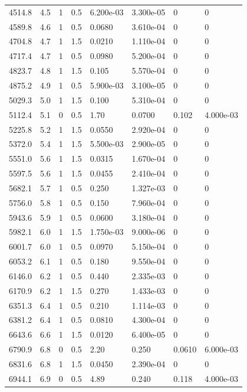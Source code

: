 \documentclass[preview]{standalone}
\begin{document}
{{\begin{tabular}{L{1.2cm}C{1.2cm} C{0.3cm}C{0.5cm} C{1.4cm}C{1.4cm} C{1.4cm}C{1.4cm}}
  4514.8  &   4.5  & 1     & 0.5 &  6.200e-03  & 3.300e-05  & 0 &  0   \\ 
  4589.8  &   4.6  & 1     & 0.5 &  0.0680  & 3.610e-04  & 0 &  0   \\ 
  4704.8  &   4.7  & 1     & 1.5 &  0.0210  & 1.110e-04  & 0 &  0   \\ 
  4717.4  &   4.7  & 1     & 0.5 &  0.0980  & 5.200e-04  & 0 &  0   \\ 
  4823.7  &   4.8  & 1     & 1.5 &  0.105  & 5.570e-04  & 0 &  0   \\ 
  4875.2  &   4.9  & 1     & 0.5 &  5.900e-03  & 3.100e-05  & 0 &  0   \\ 
  5029.3  &   5.0  & 1     & 1.5 &  0.100  & 5.310e-04  & 0 &  0   \\ 
  5112.4  &   5.1  & 0     & 0.5 &  1.70  & 0.0700  & 0.102 &  4.000e-03   \\ 
  5225.8  &   5.2  & 1     & 1.5 &  0.0550  & 2.920e-04  & 0 &  0   \\ 
  5372.0  &   5.4  & 1     & 1.5 &  5.500e-03  & 2.900e-05  & 0 &  0   \\ 
  5551.0  &   5.6  & 1     & 1.5 &  0.0315  & 1.670e-04  & 0 &  0   \\ 
  5597.5  &   5.6  & 1     & 1.5 &  0.0455  & 2.410e-04  & 0 &  0   \\ 
  5682.1  &   5.7  & 1     & 0.5 &  0.250  & 1.327e-03  & 0 &  0   \\ 
  5756.0  &   5.8  & 1     & 0.5 &  0.150  & 7.960e-04  & 0 &  0   \\ 
  5943.6  &   5.9  & 1     & 0.5 &  0.0600  & 3.180e-04  & 0 &  0   \\ 
  5982.1  &   6.0  & 1     & 1.5 &  1.750e-03  & 9.000e-06  & 0 &  0   \\ 
  6001.7  &   6.0  & 1     & 0.5 &  0.0970  & 5.150e-04  & 0 &  0   \\ 
  6053.2  &   6.1  & 1     & 0.5 &  0.180  & 9.550e-04  & 0 &  0   \\ 
  6146.0  &   6.2  & 1     & 0.5 &  0.440  & 2.335e-03  & 0 &  0   \\ 
  6170.9  &   6.2  & 1     & 1.5 &  0.270  & 1.433e-03  & 0 &  0   \\ 
  6351.3  &   6.4  & 1     & 0.5 &  0.210  & 1.114e-03  & 0 &  0   \\ 
  6381.2  &   6.4  & 1     & 0.5 &  0.0810  & 4.300e-04  & 0 &  0   \\ 
  6643.6  &   6.6  & 1     & 1.5 &  0.0120  & 6.400e-05  & 0 &  0   \\ 
  6790.9  &   6.8  & 0     & 0.5 &  2.20  & 0.250  & 0.0610 &  6.000e-03   \\ 
  6831.6  &   6.8  & 1     & 1.5 &  0.0450  & 2.390e-04  & 0 &  0   \\ 
  6944.1  &   6.9  & 0     & 0.5 &  4.89  & 0.240  & 0.118 &  4.000e-03   \\ 
\hline 
\end{tabular} 

}}
\end{document}
